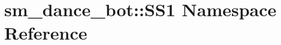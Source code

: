 \hypertarget{namespacesm__dance__bot_1_1SS1}{}\section{sm\+\_\+dance\+\_\+bot\+:\+:S\+S1 Namespace Reference}
\label{namespacesm__dance__bot_1_1SS1}
